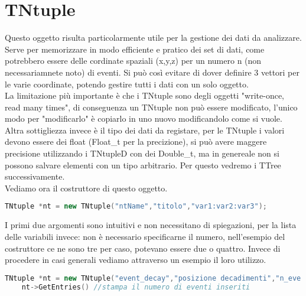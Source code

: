 \section{TNtuple}
Questo oggetto risulta particolarmente utile per la gestione dei dati da analizzare. Serve per memorizzare in modo efficiente e pratico dei set di dati, come potrebbero essere delle cordinate spaziali (x,y,z) per un numero n (non necessariamnete noto) di eventi. Si può così evitare di dover definire 3 vettori per le varie coordinate, potendo gestire tutti i dati con un solo oggetto.\\
La limitazione più importante è che i TNtuple sono degli oggetti "write-once, read many times", di conseguenza un TNtuple non può essere modificato, l'unico modo per "modificarlo" è copiarlo in uno nuovo modificandolo come si vuole. Altra sottigliezza invece è il tipo dei dati da registare, per le TNtuple i valori devono essere dei float (Float\_t per la precizione), si può avere maggere precisione utilizzando i TNtupleD con dei Double\_t, ma in genereale non si possono salvare elementi con un tipo arbitrario. Per questo vedremo i TTree successivamente.\\
Vediamo ora il costruttore di questo oggetto.
\begin{lstlisting}[language=C++,label={cod1},mathescape=true,breaklines=true]
	TNtuple *nt = new TNtuple("ntName","titolo","var1:var2:var3");
\end{lstlisting}
I primi due argomenti sono intuitivi e non necessitano di spiegazioni, per la lista delle variabili invece: non è necessario specificarne il numero, nell'esempio del costruttore ce ne sono tre per caso, potevano essere due o quattro. Invece di procedere in casi generali vediamo attraverso un esempio il loro utilizzo.
\begin{lstlisting}[language=C++,label={cod1},mathescape=true,breaklines=true]
	TNtuple *nt = new TNtuple("event_decay","posizione decadimenti","n_eve:x:y:z"); //costruttore
	nt->GetEntries() //stampa il numero di eventi inseriti
\end{lstlisting}



